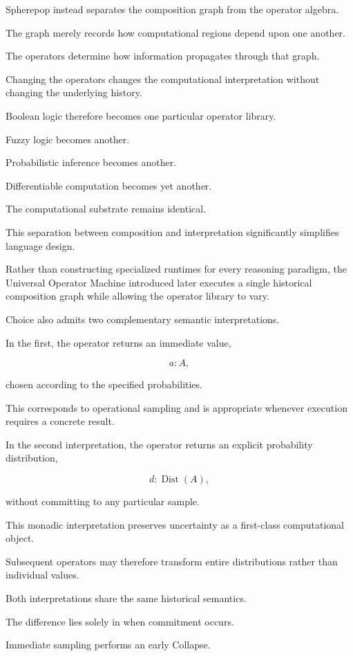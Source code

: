 \documentclass[12pt,oneside]{article}
\theoremstyle{definition}
\theoremstyle{remark}
\begin{document}
Spherepop instead separates the composition graph from the operator algebra.

The graph merely records how computational regions depend upon one another.

The operators determine how information propagates through that graph.

Changing the operators changes the computational interpretation without
changing the underlying history.

Boolean logic therefore becomes one particular operator library.

Fuzzy logic becomes another.

Probabilistic inference becomes another.

Differentiable computation becomes yet another.

The computational substrate remains identical.

This separation between composition and interpretation significantly simplifies
language design.

Rather than constructing specialized runtimes for every reasoning paradigm,
the Universal Operator Machine introduced later executes a single historical
composition graph while allowing the operator library to vary.

Choice also admits two complementary semantic interpretations.

In the first, the operator returns an immediate value,

\[
a:A,
\]

chosen according to the specified probabilities.

This corresponds to operational sampling and is appropriate whenever execution
requires a concrete result.

In the second interpretation, the operator returns an explicit probability
distribution,

\[
d:\operatorname{Dist}(A),
\]

without committing to any particular sample.

This monadic interpretation preserves uncertainty as a first-class
computational object.

Subsequent operators may therefore transform entire distributions rather than
individual values.

Both interpretations share the same historical semantics.

The difference lies solely in when commitment occurs.

Immediate sampling performs an early Collapse.
\end{document}
